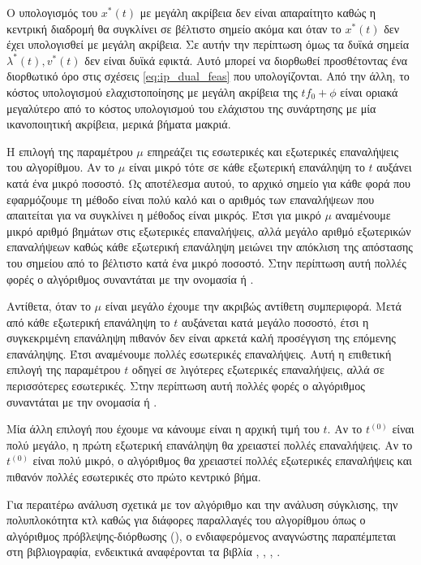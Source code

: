 Ο υπολογισμός του \( x^*(t) \) με μεγάλη ακρίβεια δεν είναι απαραίτητο καθώς η
κεντρική διαδρομή θα συγκλίνει σε βέλτιστο σημείο ακόμα και όταν το
\( x^*(t) \) δεν έχει υπολογισθεί με μεγάλη ακρίβεια. Σε αυτήν την περίπτωση
όμως τα δυϊκά σημεία \( \lambda^*(t), v^*(t) \) δεν είναι δυϊκά εφικτά. Αυτό
μπορεί να διορθωθεί προσθέτοντας ένα διορθωτικό όρο στις σχέσεις
\eqref{eq:ip_dual_feas} που υπολογίζονται. Από την άλλη, το κόστος υπολογισμού
ελαχιστοποίησης με μεγάλη ακρίβεια της \( tf_0 + \phi \) είναι οριακά μεγαλύτερο
από το κόστος υπολογισμού του ελάχιστου της συνάρτησης με μία ικανοποιητική
ακρίβεια, μερικά  βήματα μακριά.

Η επιλογή της παραμέτρου \( \mu \) επηρεάζει τις εσωτερικές και εξωτερικές
επαναλήψεις του αλγορίθμου. Αν το \( \mu \) είναι μικρό τότε σε κάθε εξωτερική
επανάληψη το \(t\) αυξάνει κατά ένα μικρό ποσοστό. Ως αποτέλεσμα αυτού, το
αρχικό σημείο για κάθε φορά που εφαρμόζουμε τη μέθοδο  είναι πολύ
καλό και ο αριθμός των επαναλήψεων που απαιτείται για να συγκλίνει η μέθοδος
 είναι μικρός. Έτσι για μικρό \( \mu \) αναμένουμε μικρό αριθμό
βημάτων  στις εξωτερικές επαναλήψεις, αλλά μεγάλο αριθμό εξωτερικών
επαναλήψεων καθώς κάθε εξωτερική επανάληψη μειώνει την απόκλιση της απόστασης
του σημείου από το βέλτιστο κατά ένα μικρό ποσοστό. Στην περίπτωση αυτή πολλές
φορές ο αλγόριθμος συναντάται με την ονομασία  ή
.

Αντίθετα, όταν το \( \mu \) είναι μεγάλο έχουμε την ακριβώς αντίθετη
συμπεριφορά. Μετά από κάθε εξωτερική επανάληψη το \(t\) αυξάνεται κατά μεγάλο
ποσοστό, έτσι η συγκεκριμένη επανάληψη πιθανόν δεν είναι αρκετά καλή προσέγγιση
της επόμενης επανάληψης. Έτσι αναμένουμε πολλές εσωτερικές επαναλήψεις. Αυτή η
επιθετική επιλογή της παραμέτρου \( t\) οδηγεί σε λιγότερες εξωτερικές
επαναλήψεις, αλλά σε περισσότερες εσωτερικές. Στην περίπτωση αυτή πολλές
φορές ο αλγόριθμος συναντάται με την ονομασία  ή
.

Μία άλλη επιλογή που έχουμε να κάνουμε είναι η αρχική τιμή του \(t\). Αν το
\(t^{(0)}\) είναι πολύ μεγάλο, η πρώτη εξωτερική επανάληψη θα χρειαστεί πολλές
επαναλήψεις. Αν το \(t^{(0)}\) είναι πολύ μικρό, ο αλγόριθμος θα χρειαστεί
πολλές εξωτερικές επαναλήψεις και πιθανόν πολλές εσωτερικές στο πρώτο κεντρικό
βήμα.

Για περαιτέρω ανάλυση σχετικά με τον αλγόριθμο 
και την ανάλυση σύγκλισης, την πολυπλοκότητα κτλ καθώς για διάφορες παραλλαγές
του αλγορίθμου όπως ο αλγόριθμος πρόβλεψης-διόρθωσης
(), ο ενδιαφερόμενος αναγνώστης παραπέμπεται στη
βιβλιογραφία, ενδεικτικά αναφέρονται τα βιβλία
\cite{boyd2004convex}, \cite{renegar2001mathematical},
\cite{nesterov1994interior}, \cite{wright1997primal}.

